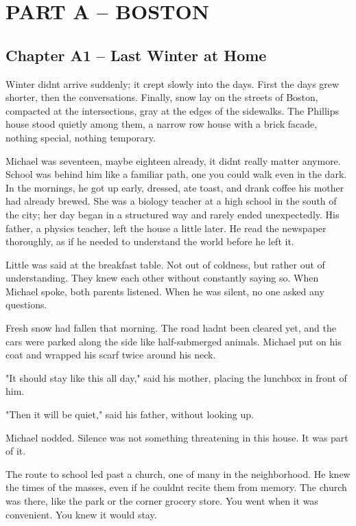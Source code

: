 \documentclass[
]{article}
\begin{document}
\section{PART A -- BOSTON}\label{part-a-boston}

\subsection{Chapter A1 -- Last Winter at Home}\label{chapter-a1-last-winter-at-home}

Winter didn\textquotesingle t arrive suddenly; it crept slowly into the days. First the days grew shorter, then the conversations. Finally, snow lay on the streets of Boston, compacted at the intersections, gray at the edges of the sidewalks. The Phillips house stood quietly among them, a narrow row house with a brick facade, nothing special, nothing temporary.

Michael was seventeen, maybe eighteen already, it didn\textquotesingle t really matter anymore. School was behind him like a familiar path, one you could walk even in the dark. In the mornings, he got up early, dressed, ate toast, and drank coffee his mother had already brewed. She was a biology teacher at a high school in the south of the city; her day began in a structured way and rarely ended unexpectedly. His father, a physics teacher, left the house a little later. He read the newspaper thoroughly, as if he needed to understand the world before he left it.

Little was said at the breakfast table. Not out of coldness, but rather out of understanding. They knew each other without constantly saying so. When Michael spoke, both parents listened. When he was silent, no one asked any questions.

Fresh snow had fallen that morning. The road hadn\textquotesingle t been cleared yet, and the cars were parked along the side like half-submerged animals. Michael put on his coat and wrapped his scarf twice around his neck.

"It should stay like this all day," said his mother, placing the lunchbox in front of him.

"Then it will be quiet," said his father, without looking up.

Michael nodded. Silence was not something threatening in this house. It was part of it.

The route to school led past a church, one of many in the neighborhood. He knew the times of the masses, even if he couldn\textquotesingle t recite them from memory. The church was there, like the park or the corner grocery store. You went when it was convenient. You knew it would stay.
\end{document}
